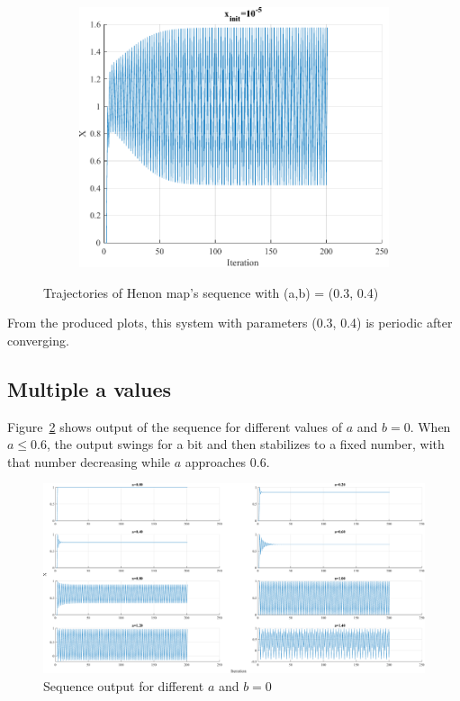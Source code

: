 \begin{figure}[htpb]
\begin{subfigure}{.47\textwidth}
		\includegraphics[width=\textwidth]{../Problem 3/prob3_x_init_1e-5.pdf}
		\caption{}
	\end{subfigure}
	\caption{Trajectories of Henon map's sequence with (a,b) = (0.3, 0.4)}
	\label{fig:prob3_x_init}
\end{figure}
From the produced plots, this system with parameters (0.3, 0.4) is periodic after converging.

\subsection{Multiple a values}
Figure~\ref{fig:prob3_multiple_a} shows output of the sequence for different values of $a$ and $b=0$. When $a \le 0.6$, the output swings for a bit and then stabilizes to a fixed number, with that number decreasing while $a$ approaches $0.6$.


\begin{figure}[htpb]
	\centering
	\includegraphics[width=\textwidth]{../Problem 3/prob3_(a)_multiple_a_b_0.pdf}
	\caption{Sequence output for different $a$ and $b=0$}
	\label{fig:prob3_multiple_a}
\end{figure}

